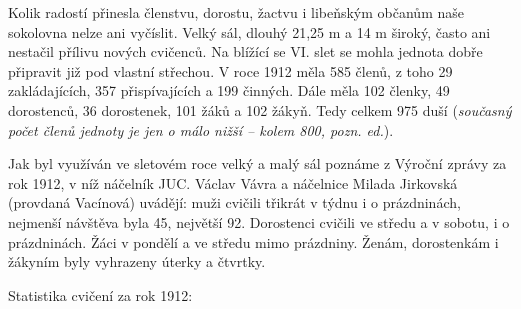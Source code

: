 Kolik radostí přinesla členstvu, dorostu, žactvu i libeňským občanům
naše sokolovna nelze ani vyčíslit. Velký sál, dlouhý 21,25 m a 14 m
široký, často ani nestačil přílivu nových cvičenců. Na blížící se VI.
slet se mohla jednota dobře připravit již pod vlastní střechou. V roce
1912 měla 585 členů, z toho 29 zakládajících, 357 přispívajících a 199
činných. Dále měla 102 členky, 49 dorostenců, 36 dorostenek, 101 žáků a
102 žákyň. Tedy celkem 975 duší (\emph{současný počet členů jednoty je
jen o málo nižší -- kolem 800, pozn. ed.}).

Jak byl využíván ve sletovém roce velký a malý sál poznáme z Výroční
zprávy za rok 1912, v níž náčelník JUC. Václav Vávra a náčelnice Milada
Jirkovská (provdaná Vacínová) uvádějí: muži cvičili třikrát v týdnu i o
prázdninách, nejmenší návštěva byla 45, největší 92. Dorostenci cvičili
ve středu a v sobotu, i o prázdninách. Žáci v pondělí a ve středu mimo
prázdniny. Ženám, dorostenkám i žákyním byly vyhrazeny úterky a čtvrtky.

Statistika cvičení za rok 1912:

